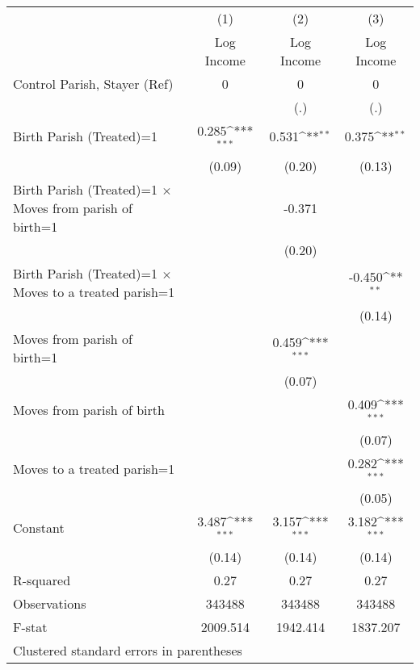 {
\def\sym#1{\ifmmode^{#1}\else\(^{#1}\)\fi}
\begin{tabular}{l*{3}{c}}
\hline\hline
                    &\multicolumn{1}{c}{(1)}&\multicolumn{1}{c}{(2)}&\multicolumn{1}{c}{(3)}\\
                    &\multicolumn{1}{c}{Log Income}&\multicolumn{1}{c}{Log Income}&\multicolumn{1}{c}{Log Income}\\
\hline
Control Parish, Stayer (Ref) &         0            &       0         &       0         \\
                    &                     &         (.)         &         (.)         \\
Birth Parish (Treated)=1&          0.285\sym{***}           &       0.531\sym{**} &       0.375\sym{**} \\
                    &                (0.09)      &      (0.20)         &      (0.13)         \\
Birth Parish (Treated)=1 $\times$ Moves from parish of birth=1&                     &      -0.371         &                     \\
                    &                     &      (0.20)         &                     \\
Birth Parish (Treated)=1 $\times$ Moves to a treated parish=1&                     &                     &      -0.450\sym{**} \\
                    &                     &                     &      (0.14)         \\
Moves from parish of birth=1&                     &       0.459\sym{***}&                     \\
                    &                     &      (0.07)         &                     \\
Moves from parish of birth&                     &                     &       0.409\sym{***}\\
                    &                     &                     &      (0.07)         \\
Moves to a treated parish=1&                     &                     &       0.282\sym{***}\\
                    &                     &                     &      (0.05)         \\
Constant            &       3.487\sym{***}&       3.157\sym{***}&       3.182\sym{***}\\
                    &      (0.14)         &      (0.14)         &      (0.14)         \\
\hline
R-squared           &        0.27         &        0.27         &        0.27         \\
Observations        &      343488         &      343488         &      343488         \\
F-stat              &    2009.514         &    1942.414         &    1837.207         \\
\hline\hline
\multicolumn{4}{l}{\footnotesize Clustered standard errors in parentheses}\\
\end{tabular}
}
